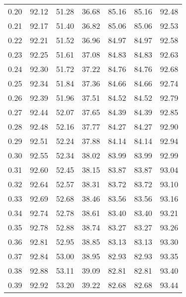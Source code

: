 \begin{tabular}{|c|c|c|c|c|c|c|}
      0.20 &     92.12 &     51.28 &      36.68 &   85.16 &      85.16 &         92.48 \\
      0.21 &     92.17 &     51.40 &      36.82 &   85.06 &      85.06 &         92.53 \\
      0.22 &     92.21 &     51.52 &      36.96 &   84.97 &      84.97 &         92.58 \\
      0.23 &     92.25 &     51.61 &      37.08 &   84.83 &      84.83 &         92.63 \\
      0.24 &     92.30 &     51.72 &      37.22 &   84.76 &      84.76 &         92.68 \\
      0.25 &     92.34 &     51.84 &      37.36 &   84.66 &      84.66 &         92.74 \\
      0.26 &     92.39 &     51.96 &      37.51 &   84.52 &      84.52 &         92.79 \\
      0.27 &     92.44 &     52.07 &      37.65 &   84.39 &      84.39 &         92.85 \\
      0.28 &     92.48 &     52.16 &      37.77 &   84.27 &      84.27 &         92.90 \\
      0.29 &     92.51 &     52.24 &      37.88 &   84.14 &      84.14 &         92.94 \\
      0.30 &     92.55 &     52.34 &      38.02 &   83.99 &      83.99 &         92.99 \\
      0.31 &     92.60 &     52.45 &      38.15 &   83.87 &      83.87 &         93.04 \\
      0.32 &     92.64 &     52.57 &      38.31 &   83.72 &      83.72 &         93.10 \\
      0.33 &     92.69 &     52.68 &      38.46 &   83.56 &      83.56 &         93.16 \\
      0.34 &     92.74 &     52.78 &      38.61 &   83.40 &      83.40 &         93.21 \\
      0.35 &     92.78 &     52.88 &      38.74 &   83.27 &      83.27 &         93.26 \\
      0.36 &     92.81 &     52.95 &      38.85 &   83.13 &      83.13 &         93.30 \\
      0.37 &     92.84 &     53.00 &      38.95 &   82.93 &      82.93 &         93.35 \\
      0.38 &     92.88 &     53.11 &      39.09 &   82.81 &      82.81 &         93.40 \\
      0.39 &     92.92 &     53.20 &      39.22 &   82.68 &      82.68 &         93.44 \\

\end{tabular}
